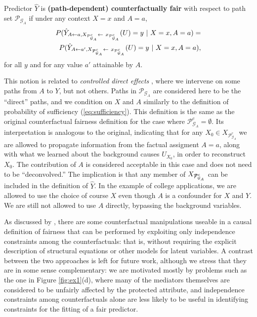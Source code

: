 \begin{define}
  Predictor $\hat Y$ is {\bf (path-dependent) counterfactually fair}
  with respect to path set $\mathcal P_{\mathcal G_A}$ if under any
  context $X = x$ and $A = a$,
  \label{eq:cf_definition}
\begin{align}
  P(\hat Y_{A \leftarrow a, X_{\mathcal P^c_{\mathcal G_A}} \leftarrow\ x_{\mathcal P^c_{\mathcal G_A}}}(U) = y\ |\ X = x, A = a)  =
  \nonumber\\ 
  P(\hat Y_{A \leftarrow a', X_{\not \mathcal P^c_{\mathcal G_A}} \leftarrow\ x_{ \mathcal P^c_{\mathcal G_A}}}(U) = y\ |\ X = x, A = a), 
\end{align}
for all $y$ and for any value $a'$ attainable by $A$.
\end{define}

This notion is related to {\it controlled direct effects}
\citep{pearl:16}, where we intervene on some paths from $A$ to $Y$,
but not others. Paths in $\mathcal P_{\mathcal G_A}$ are considered
here to be the ``direct'' paths, and we condition on $X$ and $A$
similarly to the definition of probability of sufficiency
(\ref{eq:sufficiency}). This definition is the same as the original
counterfactual fairness definition for the case where $\mathcal
P^c_{\mathcal G_A} = \emptyset$. Its interpretation is analogous to
the original, indicating that for any $X_0 \in X_{\mathcal
  P^c_{\mathcal G_A}}$ we are allowed to propagate information from
the factual assigment $A = a$, along with what we learned about the
background causes $U_{X_0}$, in order to reconstruct $X_0$. The
contribution of $A$ is considered acceptable in this case and does not
need to be ``deconvolved.''  The implication is that any member of
$X_{\not \mathcal P^c_{\mathcal G_A}}$ can be included in the
definition of $\hat Y$. In the example of college applications, we are
allowed to use the choice of course $X$ even though $A$ is a
confounder for $X$ and $Y$. We are still not allowed to use $A$
directly, bypassing the background variables.

As discussed by \cite{nabi:17}, there are some counterfactual
manipulations useable in a causal definition of fairness that can be
performed by exploiting only independence constraints among the
counterfactuals: that is, without requiring the explicit description
of structural equations or other models for latent variables. A
contrast between the two approaches is left for future work, although
we stress that they are in some sense complementary: we are motivated
mostly by problems such as the one in Figure \ref{fig:ex1}(d), where
many of the mediators themselves are considered to be unfairly
affected by the protected attribute, and independence constraints
among counterfactuals alone are less likely to be useful in
identifying constraints for the fitting of a fair predictor.

